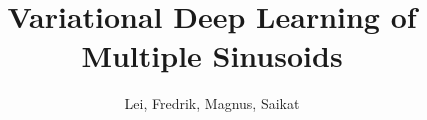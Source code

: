 \documentclass[journal,onecolumn]{IEEEtran}
\begin{document}
%

\title{Variational Deep Learning of Multiple Sinusoids}

%
%
%

% 
%

\author{Lei, Fredrik, Magnus, Saikat}        
        

% 
%
\end{document}
